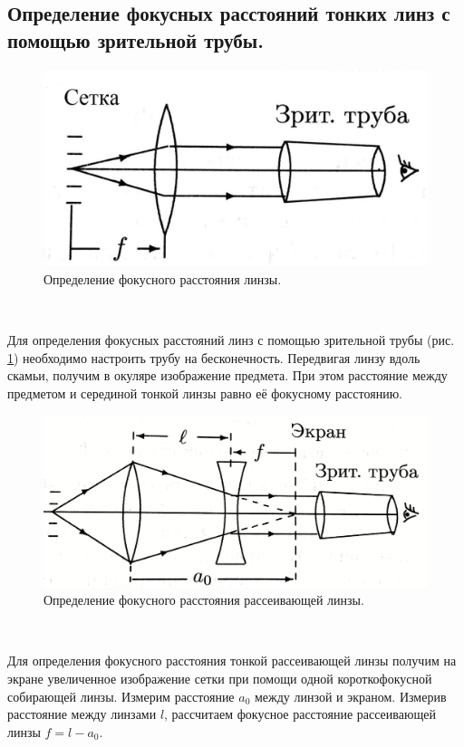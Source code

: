 \documentclass[a4paper, 12pt, twoside]{article}
\begin{document}
	\subsection{Определение фокусных расстояний тонких линз с помощью зрительной трубы.}
	\begin{minipage}{0.49\linewidth}
		\begin{figure}[H]
			\centering
			\includegraphics[width =  \textwidth]{img1}
			\caption{Определение фокусного расстояния линзы.}
			\label{img1}
		\end{figure}
	\end{minipage}
	~
	\begin{minipage}{0.49\linewidth}
		Для определения фокусных расстояний линз с помощью зрительной трубы (рис. \ref{img1}) необходимо настроить трубу на бесконечность. Передвигая линзу вдоль скамьи, получим в окуляре изображение предмета. При этом расстояние между предметом и серединой тонкой линзы равно её фокусному расстоянию.
	\end{minipage}

	\begin{minipage}{0.49\linewidth}
		\begin{figure}[H]
			\centering
			\includegraphics[width =  \textwidth]{img2}
			\caption{Определение фокусного расстояния рассеивающей линзы.}
			\label{img2}
		\end{figure}
	\end{minipage}
	~
	\begin{minipage}{0.49\linewidth}
	Для определения фокусного расстояния тонкой рассеивающей линзы получим на экране увеличенное изображение сетки при помощи одной короткофокусной собирающей линзы. Измерим расстояние $a_0$ между линзой и экраном. Измерив расстояние между линзами $l$, рассчитаем фокусное расстояние рассеивающей линзы $f = l - a_0$.
	\end{minipage}
\end{document}
